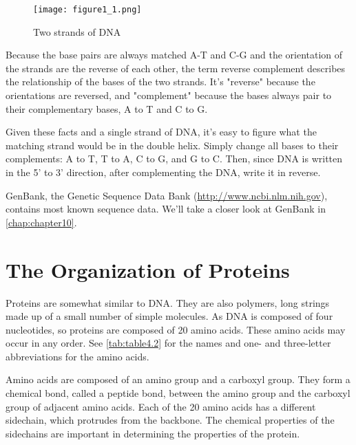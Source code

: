 \begin{figure}
  \centering
  \texttt{[image: figure1\_1.png]}
  \caption{Two strands of DNA}
  \label{fig:figure1.1}
\end{figure}

Because the base pairs are always matched A-T and C-G and the orientation of the strands are the reverse of each other, the term reverse complement describes the relationship of the bases of the two strands. It's "reverse" because the orientations are reversed, and "complement" because the bases always pair to their complementary bases, A to T and C to G.

Given these facts and a single strand of DNA, it's easy to figure what the matching strand would be in the double helix. Simply change all bases to their complements: A to T, T to A, C to G, and G to C. Then, since DNA is written in the 5' to 3' direction, after complementing the DNA, write it in reverse.

GenBank, the Genetic Sequence Data Bank (\href{http://www.ncbi.nlm.nih.gov}{http://www.ncbi.nlm.nih.gov}), contains most known sequence data. We'll take a closer look at GenBank in \autoref{chap:chapter10}. 

\section{The Organization of Proteins}
Proteins are somewhat similar to DNA. They are also polymers, long strings made up of a small number of simple molecules. As DNA is composed of four nucleotides, so proteins are composed of 20 amino acids. These amino acids may occur in any order. See \autoref{tab:table4.2} for the names and one- and three-letter abbreviations for the amino acids.  

Amino acids are composed of an amino group and a carboxyl group. They form a chemical bond, called a peptide bond, between the amino group and the carboxyl group of adjacent amino acids. Each of the 20 amino acids has a different sidechain, which protrudes from the backbone. The chemical properties of the sidechains are important in determining the properties of the protein.

